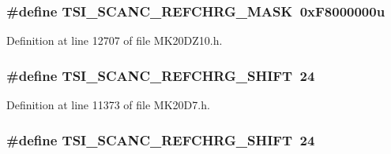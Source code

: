 \subsubsection[{\texorpdfstring{T\+S\+I\+\_\+\+S\+C\+A\+N\+C\+\_\+\+R\+E\+F\+C\+H\+R\+G\+\_\+\+M\+A\+SK}{TSI_SCANC_REFCHRG_MASK}}]{\setlength{\rightskip}{0pt plus 5cm}\#define T\+S\+I\+\_\+\+S\+C\+A\+N\+C\+\_\+\+R\+E\+F\+C\+H\+R\+G\+\_\+\+M\+A\+SK~0x\+F8000000u}\hypertarget{group___t_s_i___register___masks_ga080be6d8826668cf4d63346b449931ed}{}\label{group___t_s_i___register___masks_ga080be6d8826668cf4d63346b449931ed}


Definition at line 12707 of file M\+K20\+D\+Z10.\+h.

\subsubsection[{\texorpdfstring{T\+S\+I\+\_\+\+S\+C\+A\+N\+C\+\_\+\+R\+E\+F\+C\+H\+R\+G\+\_\+\+S\+H\+I\+FT}{TSI_SCANC_REFCHRG_SHIFT}}]{\setlength{\rightskip}{0pt plus 5cm}\#define T\+S\+I\+\_\+\+S\+C\+A\+N\+C\+\_\+\+R\+E\+F\+C\+H\+R\+G\+\_\+\+S\+H\+I\+FT~24}\hypertarget{group___t_s_i___register___masks_ga636c8873ea4eb5255f0f76fef1a8a5ba}{}\label{group___t_s_i___register___masks_ga636c8873ea4eb5255f0f76fef1a8a5ba}


Definition at line 11373 of file M\+K20\+D7.\+h.

\subsubsection[{\texorpdfstring{T\+S\+I\+\_\+\+S\+C\+A\+N\+C\+\_\+\+R\+E\+F\+C\+H\+R\+G\+\_\+\+S\+H\+I\+FT}{TSI_SCANC_REFCHRG_SHIFT}}]{\setlength{\rightskip}{0pt plus 5cm}\#define T\+S\+I\+\_\+\+S\+C\+A\+N\+C\+\_\+\+R\+E\+F\+C\+H\+R\+G\+\_\+\+S\+H\+I\+FT~24}\hypertarget{group___t_s_i___register___masks_ga636c8873ea4eb5255f0f76fef1a8a5ba}{}\label{group___t_s_i___register___masks_ga636c8873ea4eb5255f0f76fef1a8a5ba}


